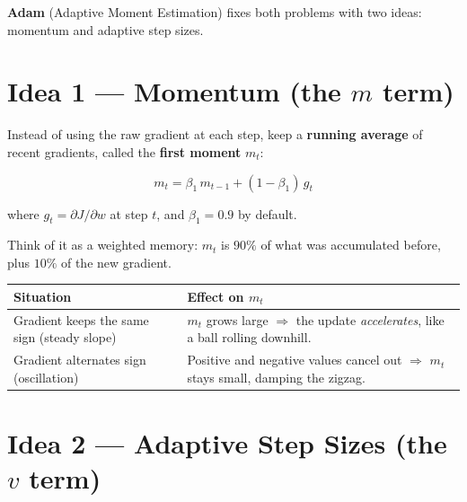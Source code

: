 \documentclass[12pt, a4paper]{article}
\theoremstyle{definition}
\begin{document}
\begin{center}
\end{center}

\textbf{Adam} (Adaptive Moment Estimation) fixes both problems with two ideas:
momentum and adaptive step sizes.

\section{Idea 1 — Momentum (the $m$ term)}

Instead of using the raw gradient at each step, keep a \textbf{running
average} of recent gradients, called the \textbf{first moment} $m_t$:

\[
  m_t = \beta_1 \, m_{t-1} + (1 - \beta_1)\, g_t
\]

where $g_t = \partial J / \partial w$ at step $t$, and $\beta_1 = 0.9$ by
default.

Think of it as a weighted memory: $m_t$ is $90\%$ of what was accumulated
before, plus $10\%$ of the new gradient.

\begin{center}
\renewcommand{\arraystretch}{1.3}
\begin{tabular}{lp{9cm}}
\toprule
Situation & Effect on $m_t$ \\
\midrule
Gradient keeps the same sign (steady slope) &
  $m_t$ grows large $\Rightarrow$ the update \emph{accelerates}, like a
  ball rolling downhill. \\
Gradient alternates sign (oscillation) &
  Positive and negative values cancel out $\Rightarrow$ $m_t$ stays small,
  damping the zigzag. \\
\bottomrule
\end{tabular}
\end{center}

\section{Idea 2 --- Adaptive Step Sizes (the $v$ term)}
\end{document}
